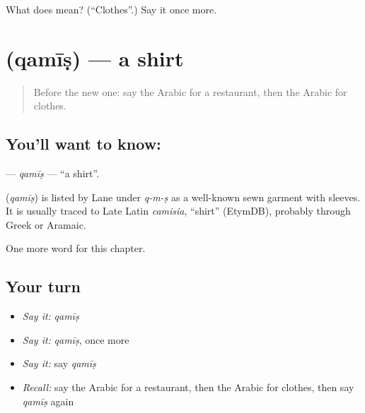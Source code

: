 \begin{tcolorbox}[breakable,colback=teal!4,colframe=teal!35!black,title={Before you move on}]
What does  mean? (\textquotedblleft{}Clothes\textquotedblright{}.) Say it once more.
\end{tcolorbox}
\section[\texorpdfstring{\ar{قميص} (qamīṣ)}{قميص (qamīṣ)}]{ (qamīṣ) — a shirt}

\label{lesson:AR-C94-qamis}



\begin{quote}
Before the new one: say the Arabic for a restaurant, then the Arabic for clothes.
\end{quote}

\subsection*{You'll want to know: }
\textbf{} — \emph{qamīṣ} — \textquotedblleft{}a shirt\textquotedblright{}.

\begin{cousinweb}
\textbf{} (\emph{qamīṣ}) is listed by Lane under \emph{q-m-ṣ} as a well-known sewn garment with sleeves. It is usually traced to Late Latin \emph{camisia}, \textquotedblleft{}shirt\textquotedblright{} (EtymDB), probably through Greek or Aramaic.
\end{cousinweb}

\begin{grammarlens}[title={What you've built}]
One more word for this chapter.
\end{grammarlens}

\subsection*{Your turn}
\begin{itemize}
\raggedright
  \item \emph{Say it:} \emph{qamīṣ}
  \item \emph{Say it:} \emph{qamīṣ}, once more
  \item \emph{Say it:} say \emph{qamīṣ}
  \item \emph{Recall:} say the Arabic for a restaurant, then the Arabic for clothes, then say \emph{qamīṣ} again
\end{itemize}

